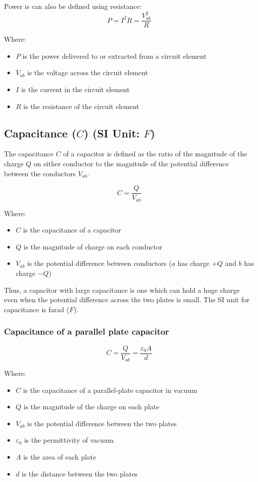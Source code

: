 \documentclass[11pt]{article}
\begin{document}
Power is can also be defined using resistance:
\[P = I^2 R = \frac{V_{ab}^2}{R}\]

Where:
\begin{itemize}
\item \(P\) is the power delivered to or extracted from a circuit element
\item \(V_{ab}\) is the voltage across the circuit element
\item \(I\) is the current in the circuit element
\item \(R\) is the resistance of the circuit element
\end{itemize}

\subsection{Capacitance (\(C\)) (SI Unit: \(\unit{F}\))}
\label{sec:org3243b41}
The capacitance \(C\) of a capacitor is defined as the ratio of the magnitude of the charge \(Q\) on either conductor to the magnitude of the potential difference between the conductors \(V_{ab}\).

\[C = \frac{Q}{V_{ab}}\]

Where:
\begin{itemize}
\item \(C\) is the capacitance of a capacitor
\item \(Q\) is the magnitude of charge on each conductor
\item \(V_{ab}\) is the potential difference between conductors (\(a\) has charge \(+Q\) and \(b\) has charge \(-Q\))
\end{itemize}

Thus, a capacitor with large capacitance is one which can hold a huge charge even when the potential difference across the two plates is small. The SI unit for capacitance is farad (\(\unit{F}\)).

\subsubsection{Capacitance of a parallel plate capacitor}
\label{sec:org3c64e08}
\[C = \frac{Q}{V_{ab}} = \frac{\varepsilon_0 A}{d}\]

Where:
\begin{itemize}
\item \(C\) is the capacitance of a parallel-plate capacitor in vacuum
\item \(Q\) is the magnitude of the charge on each plate
\item \(V_{ab}\) is the potential difference between the two plates
\item \(\varepsilon_0\) is the permittivity of vacuum
\item \(A\) is the area of each plate
\item \(d\) is the distance between the two plates
\end{itemize}
\end{document}

